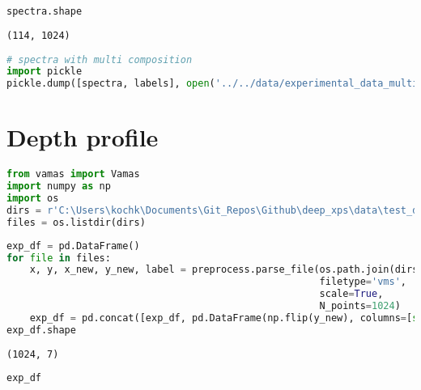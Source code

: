 \begin{lstlisting}[language=Python]
spectra.shape
\end{lstlisting}

\begin{lstlisting}
(114, 1024)
\end{lstlisting}

\begin{lstlisting}[language=Python]
# spectra with multi composition
import pickle
pickle.dump([spectra, labels], open('../../data/experimental_data_multi.pkl', 'wb'))
\end{lstlisting}

\hypertarget{depth-profile}{%
\section*{Depth profile}\label{depth-profile}}

\begin{lstlisting}[language=Python]
from vamas import Vamas
import numpy as np
import os
dirs = r'C:\Users\kochk\Documents\Git_Repos\Github\deep_xps\data\test_data\Selected_Spectra\gradient_thickness'
files = os.listdir(dirs)
\end{lstlisting}

\begin{lstlisting}[language=Python]
exp_df = pd.DataFrame()
for file in files:
    x, y, x_new, y_new, label = preprocess.parse_file(os.path.join(dirs, file), 
                                                      filetype='vms',
                                                      scale=True,
                                                      N_points=1024)
    exp_df = pd.concat([exp_df, pd.DataFrame(np.flip(y_new), columns=[str('_'.join(label)+'_'+file.split('_')[2]+'_separate')])], axis=1)
exp_df.shape
\end{lstlisting}

\begin{lstlisting}
(1024, 7)
\end{lstlisting}

\begin{lstlisting}[language=Python]
exp_df
\end{lstlisting}

